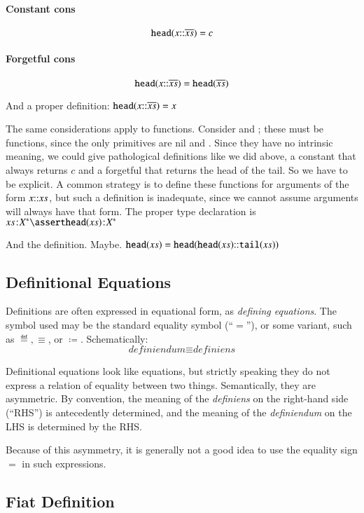 \paragraph{Constant cons}
\[\texttt{\upshape head}(x{\mathpunct{::}}\overline{xs}) = c\]

\paragraph{Forgetful cons}
\[\texttt{\upshape head}(x{\mathpunct{::}}\overline{xs}) = \texttt{\upshape head}(\overline{xs})\]

And a proper definition: \(\texttt{\upshape head}(x{\mathpunct{::}}\overline{xs}) = x\)

The same considerations apply to functions. Consider \head{} and
\tail{}; these must be functions, since the only primitives are nil
and \Cons. Since they have no intrinsic meaning, we could give
pathological definitions like we did above, a constant \head{} that
always returns \(c\) and a forgetful \head{} that returns the head of
the tail. So we have to be explicit. A common strategy is to define
these functions for arguments of the form \(x{\mathpunct{::}} xs\), but such a
definition is inadequate, since we cannot assume arguments will always
have that form. The proper type declaration is
\(\tj{\seq{x}}{\List{X}} \linfer \tj{\head(\seq{x})}{\List{X}}\)

And the definition. Maybe.
\(\texttt{\upshape head}(xs) = \texttt{\upshape head}(\texttt{\upshape head}(xs){\mathpunct{::}}\texttt{\upshape tail}(xs))\)

\subsection{Definitional Equations}

Definitions are often expressed in equational form, as
\textit{defining equations}. The symbol used may be the standard
equality symbol (``\(=\)''), or some variant, such as \(\eqdef,
\equiv\), or \(\coloneqq\). Schematically:
\[\textit{definiendum}\equiv\textit{definiens}\]

Definitional equations look like equations, but strictly speaking they
do not express a relation of equality between two things.
Semantically, they are asymmetric. By convention, the meaning of the
\textit{definiens} on the right-hand side (``RHS'') is antecedently
determined, and the meaning of the \textit{definiendum} on the LHS is
determined by the RHS.

Because of this asymmetry, it is generally not a good idea to use the
equality sign \(=\) in such expressions.

\subsection{Fiat Definition}

